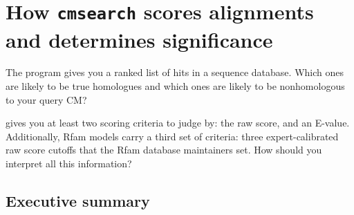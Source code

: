 \section{How \texttt{cmsearch} scores alignments and determines significance}

The  program gives you a ranked list of hits in a
sequence database.  Which ones are likely to be true homologues and
which ones are likely to be nonhomologous to your query CM?

 gives you at least two scoring criteria to judge
by: the  raw score, and an E-value. Additionally,
Rfam models carry a third set of criteria: three expert-calibrated raw
score cutoffs that the Rfam database maintainers set. How should you
interpret all this information?

\subsection{Executive summary}

